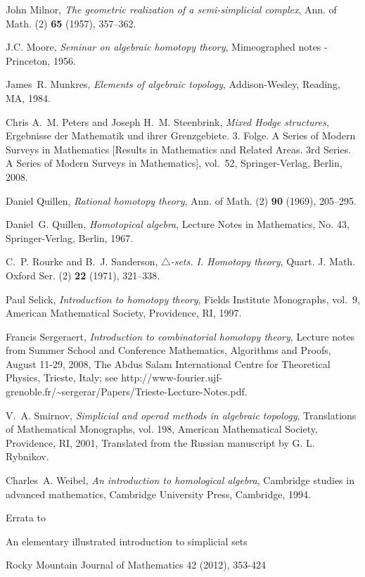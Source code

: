 \documentclass[12pt]{article}
\theoremstyle{plain}
\theoremstyle{definition}
\begin{document}
\begin{thebibliography}{10}
John Milnor, \emph{The geometric realization of a semi-simplicial complex},
  Ann. of Math. (2) \textbf{65} (1957), 357--362.

J.C. Moore, \emph{Seminar on algebraic homotopy theory}, Mimeographed notes -
  Princeton, 1956.

James~R. Munkres, \emph{Elements of algebraic topology}, Addison-Wesley,
  Reading, MA, 1984.

Chris A.~M. Peters and Joseph H.~M. Steenbrink, \emph{Mixed {H}odge
  structures}, Ergebnisse der Mathematik und ihrer Grenzgebiete. 3. Folge. A
  Series of Modern Surveys in Mathematics [Results in Mathematics and Related
  Areas. 3rd Series. A Series of Modern Surveys in Mathematics], vol.~52,
  Springer-Verlag, Berlin, 2008.

Daniel Quillen, \emph{Rational homotopy theory}, Ann. of Math. (2) \textbf{90}
  (1969), 205--295.

Daniel~G. Quillen, \emph{Homotopical algebra}, Lecture Notes in Mathematics,
  No. 43, Springer-Verlag, Berlin, 1967.

C.~P. Rourke and B.~J. Sanderson, \emph{{$\triangle $}-sets. {I}. {H}omotopy
  theory}, Quart. J. Math. Oxford Ser. (2) \textbf{22} (1971), 321--338.

Paul Selick, \emph{Introduction to homotopy theory}, Fields Institute
  Monographs, vol.~9, American Mathematical Society, Providence, RI, 1997.

Francis Sergeraert, \emph{Introduction to combinatorial homotopy theory},
  Lecture notes from Summer School and Conference Mathematics, Algorithms and
  Proofs, August 11-29, 2008, The Abdus Salam International Centre for
  Theoretical Physics, Trieste, Italy; see
  http://www-fourier.ujf-grenoble.fr/\~{}sergerar/Papers/Trieste-Lecture-Notes.pdf.

V.~A. Smirnov, \emph{Simplicial and operad methods in algebraic topology},
  Translations of Mathematical Monographs, vol. 198, American Mathematical
  Society, Providence, RI, 2001, Translated from the Russian manuscript by G.
  L. Rybnikov.

Charles~A. Weibel, \emph{An introduction to homological algebra}, Cambridge
  studies in advanced mathematics, Cambridge University Press, Cambridge, 1994.

\end{thebibliography}
\pagebreak
\begin{center}
{\Large
Errata to

An elementary illustrated introduction to simplicial sets 

Rocky Mountain Journal of Mathematics 42 (2012), 353-424 
}
\end{center}
\end{document}
